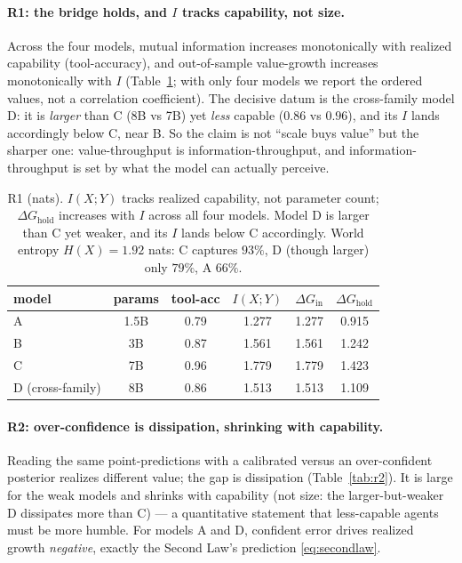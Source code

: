 \documentclass[11pt]{article}
\theoremstyle{plain}
\theoremstyle{definition}
\theoremstyle{remark}
\newcommand{\I}{I}
\begin{document}
\paragraph{R1: the bridge holds, and $\I$ tracks capability, not size.} Across the four models, mutual
information increases monotonically with realized capability (tool-accuracy), and out-of-sample value-growth
increases monotonically with $\I$ (Table~\ref{tab:r1}; with only four models we report the ordered values, not
a correlation coefficient). The decisive datum is the cross-family model D: it is \emph{larger} than C (8B vs 7B) yet
\emph{less} capable ($0.86$ vs $0.96$), and its $\I$ lands accordingly below C, near B. So the claim is not
``scale buys value'' but the sharper one: value-throughput is information-throughput, and information-throughput
is set by what the model can actually perceive.

\begin{table}[h]\centering
\begin{tabular}{lccccc}
\toprule
model & params & tool-acc & $\I(X;Y)$ & $\Delta G_{\text{in}}$ & $\Delta G_{\text{hold}}$ \\
\midrule
A & 1.5B & 0.79 & 1.277 & 1.277 & 0.915 \\
B & 3B   & 0.87 & 1.561 & 1.561 & 1.242 \\
C & 7B   & 0.96 & 1.779 & 1.779 & 1.423 \\
D (cross-family) & 8B & 0.86 & 1.513 & 1.513 & 1.109 \\
\bottomrule
\end{tabular}
\caption{R1 (nats). $\I(X;Y)$ tracks realized capability, not parameter count;
$\Delta G_{\text{hold}}$ increases with $\I$ across all four models. Model D is larger than C yet weaker, and its $\I$ lands below
C accordingly. World entropy $H(X)=1.92$ nats: C captures $93\%$, D (though larger) only $79\%$, A $66\%$.}
\label{tab:r1}
\end{table}

\paragraph{R2: over-confidence is dissipation, shrinking with capability.} Reading the same point-predictions
with a calibrated versus an over-confident posterior realizes different value; the gap is dissipation
(Table~\ref{tab:r2}). It is large for the weak models and shrinks with capability (not size: the larger-but-weaker
D dissipates more than C) --- a quantitative statement that less-capable agents must be more humble. For models A
and D, confident error drives realized growth \emph{negative}, exactly the Second Law's prediction
\eqref{eq:secondlaw}.
\end{document}
